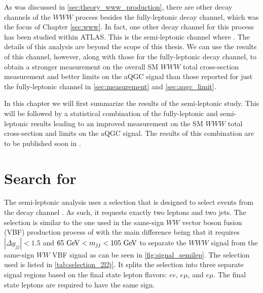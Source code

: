 
As was discussed in \sec\ref{sec:theory_www_production}, there are other decay
channels of the $WWW$ process besides the fully-leptonic decay channel,
which was the focus of Chapter \ref{sec:www}.  
In fact, one other decay channel for this process has been studied within 
ATLAS. This is the semi-leptonic channel where \wwwlljj. The details of this 
analysis are beyond the scope of this thesis. We can use the results of this channel,
however, along with those for the fully-leptonic decay channel, to obtain a stronger measurement
on the overall SM $WWW$ total cross-section measurement and better 
limits on the aQGC signal than
those reported for just the fully-leptonic 
channel in \sec\ref{sec:measurement} and \sec\ref{sec:aqgc_limit}. 


In this chapter we will first summarize the results of the semi-leptonic study. 
This will be followed by a statistical combination of the fully-leptonic and semi-leptonic
results leading to an improved  
measurement on the SM $WWW$ total cross-section and limits on the 
aQGC signal.
The results of this combination are to be published soon in \cite{wwwcomb}.




\section{Search for \wwwlljj}
\label{sec:semilep}


The semi-leptonic analysis uses a selection that is designed
to select events from the decay channel \wwwlljj. As such, 
it requests exactly two leptons and two jets.  The selection is similar
to the one used in the same-sign $WW$ vector boson fusion (VBF) production process of
\cite{PhysRevLett.113.141803} with the main difference being that
it requires $|\Delta y_{jj}| < 1.5$ and $65 \GeV < m_{jj} < 105 \GeV$
to separate the $WWW$ signal from the same-sign $WW$ VBF signal as can be
seen in \fig\ref{fig:signal_semilep}. The selection used is listed in \tab\ref{tab:selection_2l2j}.
It splits the selection into three separate signal regions based on the final
state lepton flavors: $ee$, $e\mu$, and $e\mu$. The final state leptons
are required to have the same sign.

%


